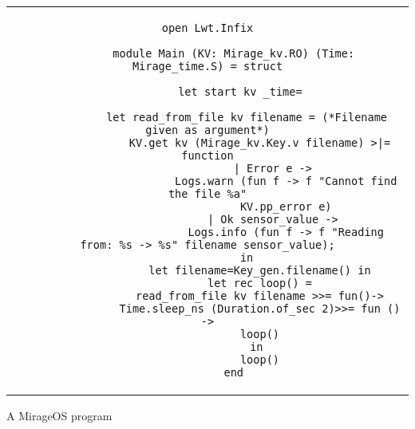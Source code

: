 \begin{code}[htpb]
    \centering
    \begin{tabular}{c}
    \begin{lstlisting}[language=caml,showstringspaces=false,breaklines=true,upquote=true]
        open Lwt.Infix

        module Main (KV: Mirage_kv.RO) (Time: Mirage_time.S) = struct
        
          let start kv _time=
        
            let read_from_file kv filename = (*Filename given as argument*)
                KV.get kv (Mirage_kv.Key.v filename) >|= function
                    | Error e ->
                        Logs.warn (fun f -> f "Cannot find the file %a"
                        KV.pp_error e)
                    | Ok sensor_value ->
                        Logs.info (fun f -> f "Reading from: %s -> %s" filename sensor_value);
            in
                let filename=Key_gen.filename() in
                let rec loop() =
                read_from_file kv filename >>= fun()->
                Time.sleep_ns (Duration.of_sec 2)>>= fun () ->
                loop()
                in 
                loop()
        end
  \end{lstlisting}
  \end{tabular}
  \caption{A MirageOS program}\label{fig:ocaml-demo}
\end{code}